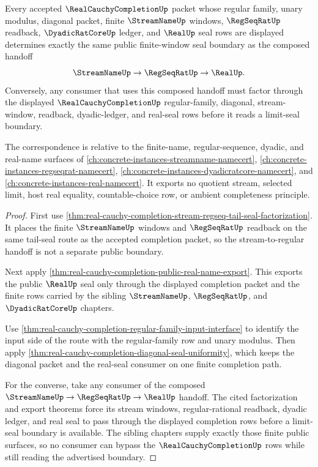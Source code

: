 \begin{theorem}
\label{thm:real-cauchy-completion-streamname-regseqrat-real-seal-correspondence}
Every accepted $\RealCauchyCompletionUp$ packet whose regular family, unary modulus, diagonal packet, finite $\StreamNameUp$ windows, $\RegSeqRatUp$ readback, $\DyadicRatCoreUp$ ledger, and $\RealUp$ seal rows are displayed determines exactly the same public finite-window seal boundary as the composed handoff
$$
\StreamNameUp \to \RegSeqRatUp \to \RealUp .
$$
Conversely, any consumer that uses this composed handoff must factor through the displayed $\RealCauchyCompletionUp$ regular-family, diagonal, stream-window, readback, dyadic-ledger, and real-seal rows before it reads a limit-seal boundary.

The correspondence is relative to the finite-name, regular-sequence, dyadic, and real-name surfaces of \autoref{ch:concrete-instances-streamname-namecert}, \autoref{ch:concrete-instances-regseqrat-namecert}, \autoref{ch:concrete-instances-dyadicratcore-namecert}, and \autoref{ch:concrete-instances-real-namecert}. It exports no quotient stream, selected limit, host real equality, countable-choice row, or ambient completeness principle.
\end{theorem}
\begin{proof}
First use \autoref{thm:real-cauchy-completion-stream-regseq-tail-seal-factorization}. It places the finite $\StreamNameUp$ windows and $\RegSeqRatUp$ readback on the same tail-seal route as the accepted completion packet, so the stream-to-regular handoff is not a separate public boundary.

Next apply \autoref{thm:real-cauchy-completion-public-real-name-export}. This exports the public $\RealUp$ seal only through the displayed completion packet and the finite rows carried by the sibling $\StreamNameUp$, $\RegSeqRatUp$, and $\DyadicRatCoreUp$ chapters.

Use \autoref{thm:real-cauchy-completion-regular-family-input-interface} to identify the input side of the route with the regular-family row and unary modulus. Then apply \autoref{thm:real-cauchy-completion-diagonal-seal-uniformity}, which keeps the diagonal packet and the real-seal consumer on one finite completion path.

For the converse, take any consumer of the composed $\StreamNameUp \to \RegSeqRatUp \to \RealUp$ handoff. The cited factorization and export theorems force its stream windows, regular-rational readback, dyadic ledger, and real seal to pass through the displayed completion rows before a limit-seal boundary is available. The sibling chapters supply exactly those finite public surfaces, so no consumer can bypass the $\RealCauchyCompletionUp$ rows while still reading the advertised boundary.
\end{proof}

